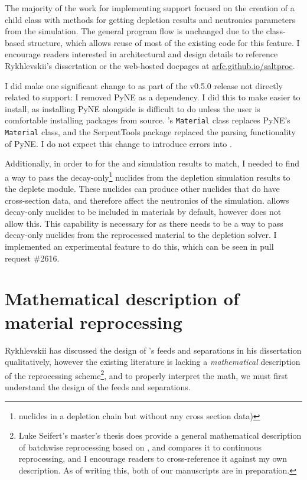 The majority of the work for implementing \OpenMC support focused on the
creation of a child class with methods for getting depletion results and
neutronics parameters from the \OpenMC simulation. The general program
flow is unchanged due to the class-based structure, which allows reuse of most
of the existing code for this feature. I encourage readers interested in
architectural and design details to reference Rykhlevskii's dissertation
\cite{rykhlevskii_fuel_2020} or the web-hosted \SaltProc docpages at
\url{arfc.github.io/saltproc}.

I did make one significant change to \SaltProc as part of the v0.5.0 release
not directly related to \OpenMC support: I removed PyNE as a dependency.
I did this to make \SaltProc easier to install, as installing PyNE alongside
\OpenMC is difficult to do unless the user is comfortable installing packages
from source. \OpenMC's \verb.Material. class replaces PyNE's \verb.Material.
class, and the SerpentTools package replaced the \SerpentTWO parsing
functionality of PyNE. I do not expect this change to introduce errors into
\SaltProc.

Additionally, in order to for the \OpenMC and \SerpentTWO simulation results
to match, I needed to find a way to pass the decay-only\footnote{nuclides in a
depletion chain but without any cross section data)} nuclides from the 
depletion simulation results to the \OpenMC deplete module. These nuclides
can produce other nuclides that do have cross-section data, and therefore affect
the neutronics of the simulation. \SerpentTWO allows
decay-only nuclides to be included in materials by default, however \OpenMC does
not allow this. This capability is necessary for \SaltProc as there needs to be a way
to pass decay-only nuclides from the reprocessed material to the depletion solver.
I implemented an experimental feature to do this, which can be seen in \OpenMC pull request
\#2616.


\section{Mathematical description of material reprocessing}
Rykhlevskii has discussed the design of \SaltProc's feeds and separations in
his dissertation \cite{rykhlevskii_fuel_2020} qualitatively, however the existing \SaltProc literature is lacking a {\it mathematical} description of the reprocessing scheme\footnote{Luke Seifert's master's thesis does provide a general
mathematical description of batchwise reprocessing based on \SaltProc, and
compares it to continuous reprocessing, and I encourage readers to
cross-reference it against my own description. As of writing this, both of
our manuscripts are in preparation.}, and to properly interpret the math, we
must first understand the design of the feeds and separations.

